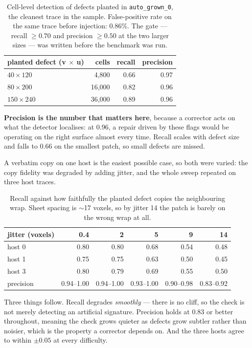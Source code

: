 \documentclass[11pt,a4paper]{article}
\begin{document}
\begin{table}[h]
\centering
\small
\begin{tabular}{lrrr}
\toprule
planted defect (v $\times$ u) & cells & recall & precision \\
\midrule
$40 \times 120$  &  4{,}800 & 0.66 & 0.97 \\
$80 \times 200$  & 16{,}000 & 0.82 & 0.96 \\
$150 \times 240$ & 36{,}000 & 0.89 & 0.96 \\
\bottomrule
\end{tabular}
\caption{Cell-level detection of defects planted in \texttt{auto\_grown\_0}, the
cleanest trace in the sample. False-positive rate on the same trace before
injection: 0.86\%. The gate --- recall $\ge 0.70$ and precision $\ge 0.50$ at
the two larger sizes --- was written before the benchmark was run.}
\end{table}

\textbf{Precision is the number that matters here}, because a corrector acts on
what the detector localises: at 0.96, a repair driven by these flags would be
operating on the right surface almost every time. Recall scales with defect size
and falls to 0.66 on the smallest patch, so small defects are missed.

A verbatim copy on one host is the easiest possible case, so both were varied:
the copy fidelity was degraded by adding jitter, and the whole sweep repeated on
three host traces.

\begin{table}[h]
\centering
\small
\begin{tabular}{lrrrrr}
\toprule
jitter (voxels) & 0.4 & 2 & 5 & 9 & 14 \\
\midrule
host 0 & 0.80 & 0.80 & 0.68 & 0.54 & 0.48 \\
host 1 & 0.75 & 0.75 & 0.63 & 0.50 & 0.45 \\
host 3 & 0.80 & 0.79 & 0.69 & 0.55 & 0.50 \\
\midrule
precision & 0.94--1.00 & 0.94--1.00 & 0.93--1.00 & 0.90--0.98 & 0.83--0.92 \\
\bottomrule
\end{tabular}
\caption{Recall against how faithfully the planted defect copies the
neighbouring wrap. Sheet spacing is $\sim$17 voxels, so by jitter 14 the patch
is barely on the wrong wrap at all.}
\end{table}

Three things follow. Recall degrades \emph{smoothly} --- there is no cliff, so
the check is not merely detecting an artificial signature. Precision holds at
0.83 or better throughout, meaning the check grows quieter as defects grow
subtler rather than noisier, which is the property a corrector depends on. And
the three hosts agree to within $\pm 0.05$ at every difficulty.
\end{document}

